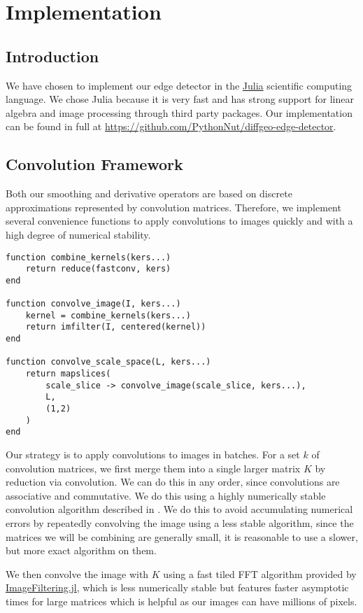 \documentclass{article}
\begin{document}
\section{Implementation}

\subsection{Introduction}

We have chosen to implement our edge detector in the \href{https://julialang.org/}{Julia} scientific computing language.
We chose Julia because it is very fast and has strong support for linear algebra and image processing through third party packages.
Our implementation can be found in full at \url{https://github.com/PythonNut/diffgeo-edge-detector}.

\subsection{Convolution Framework}

Both our smoothing and derivative operators are based on discrete approximations represented by convolution matrices.
Therefore, we implement several convenience functions to apply convolutions to images quickly and with a high degree of numerical stability.
\begin{lstlisting}
function combine_kernels(kers...)
    return reduce(fastconv, kers)
end

function convolve_image(I, kers...)
    kernel = combine_kernels(kers...)
    return imfilter(I, centered(kernel))
end

function convolve_scale_space(L, kers...)
    return mapslices(
        scale_slice -> convolve_image(scale_slice, kers...),
        L,
        (1,2)
    )
end
\end{lstlisting}

Our strategy is to apply convolutions to images in batches.
For a set $k$ of convolution matrices, we first merge them into a single larger matrix $K$ by reduction via convolution.
We can do this in any order, since convolutions are associative and commutative.
We do this using a highly numerically stable convolution algorithm described in \cite{Amini}.
We do this to avoid accumulating numerical errors by repeatedly convolving the image using a less stable algorithm, since the matrices we will be combining are generally small, it is reasonable to use a slower, but more exact algorithm on them.

We then convolve the image with $K$ using a fast tiled FFT algorithm provided by \href{https://github.com/JuliaImages/ImageFiltering.jl}{ImageFiltering.jl}, which is less numerically stable but features faster asymptotic times for large matrices which is helpful as our images can have millions of pixels.
\end{document}
